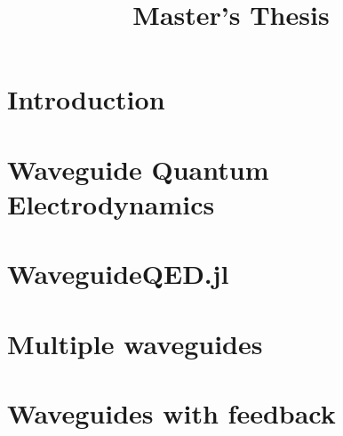 \documentclass[10pt,oneside,a4paper,english]{report}
\title{Master's Thesis} %
\begin{document}


\newpage




\newpage
\doublespacing
\renewcommand{\baselinestretch}{1}\normalsize
\tableofcontents
\renewcommand{\baselinestretch}{1}\normalsize
\thispagestyle{fancy} %

\newpage

\chapter{Introduction}
 \label{ch1} 

\chapter{Waveguide Quantum Electrodynamics}\label{ch2}



\chapter{WaveguideQED.jl \label{ch3}}


\chapter{Multiple waveguides}








%

\chapter{Waveguides with feedback}

\end{document}
